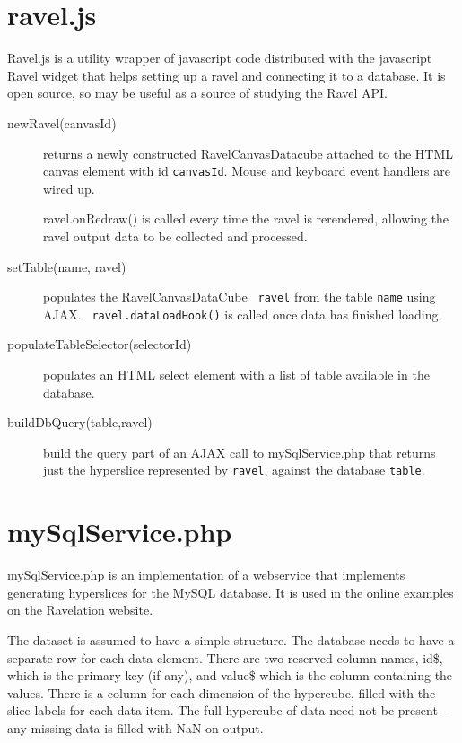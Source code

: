 \documentclass{article}
\begin{document}
\section{ravel.js}

Ravel.js is a utility wrapper of javascript code distributed with the
javascript Ravel widget that helps setting up a ravel and connecting
it to a database. It is open source, so may be useful as a source of
studying the Ravel API.

\begin{description}
  \item[newRavel(canvasId)] returns a newly constructed
    RavelCanvasDatacube attached to the HTML canvas element with id
    {\tt canvasId}. Mouse and keyboard event handlers are wired up.

    ravel.onRedraw() is called every time the ravel is rerendered,
    allowing the ravel output data to be collected and processed.
    
  \item[setTable(name, ravel)] populates the RavelCanvasDataCube {\tt
    ravel} from the table {\tt name} using AJAX. {\tt
    ravel.dataLoadHook()} is called once data has finished loading.
  \item[populateTableSelector(selectorId)] populates an HTML select
    element with a list of table available in the database.
    \item[buildDbQuery(table,ravel)] build the query part of an AJAX call
      to mySqlService.php that returns just the hyperslice represented
      by {\tt ravel}, against the database {\tt table}. 
\end{description}

\section{mySqlService.php}

mySqlService.php is an implementation of a webservice that implements
generating hyperslices for the MySQL database. It is used in the
online examples on the Ravelation website.

The dataset is assumed to have a simple structure. The database needs
to have a separate row for each data element. There are two reserved
column names, id\$, which is the primary key (if any), and value\$ which
is the column containing the values. There is a column for each
dimension of the hypercube, filled with the slice labels for each data
item. The full hypercube of data need not be present - any missing
data is filled with NaN on output.
\end{document}

